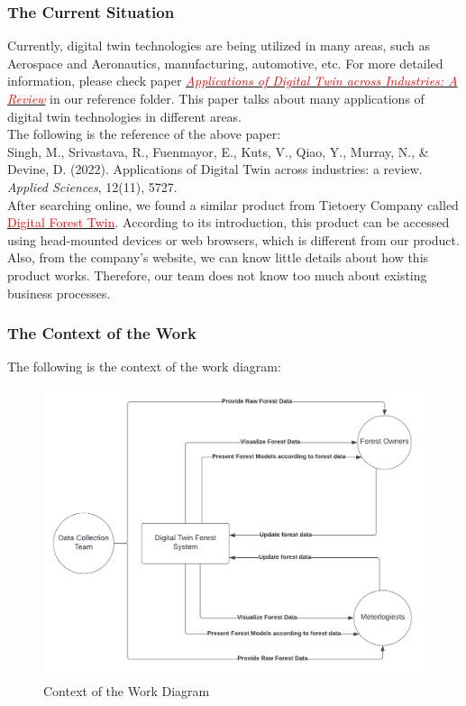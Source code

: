 \documentclass{article}
\begin{document}
\subsubsection{The Current Situation}
Currently, digital twin technologies are being utilized in many
areas, such as Aerospace and Aeronautics, manufacturing, automotive, etc. For more 
detailed information, please check paper \href{https://github.com/wuj187/DigitalTwinCAS/blob/main/refs/DT_Applications.pdf}{\textcolor{red}{\textit{Applications of Digital Twin across 
Industries: A Review}}} in our reference folder. This paper talks about 
many applications of digital twin technologies in different areas.\\
The following is the reference of the above paper:\\
Singh, M., Srivastava, R., Fuenmayor, E., Kuts, V., Qiao, Y., Murray, N., 
\& Devine, D. (2022). Applications of Digital Twin across industries: a 
review. \textit{Applied Sciences}, 12(11), 5727.\\

\noindent
After searching online, we found a similar product from Tietoery
Company called \href{https://www.tietoevry.com/en/industries/forest-pulp-paper-and-fibre/forest-solutions/wood-and-fibre-ecosystem-and-integration/digital-forest-twin/}{\textcolor{red}{Digital Forest Twin}}.
According to its introduction, this product can 
be accessed using head-mounted devices or
web browsers, which is different from our product. Also, 
from the company's website, we can know little details about how
 this product works. Therefore, our team does not know too much
 about existing business processes.

 \newpage
 
\subsubsection{The Context of the Work}
The following is the context of the work diagram:
\begin{figure}[H]
\begin{center}
\includegraphics[scale=0.7]{SRS_Pictures/Context_Use.png}
\end{center}
\caption{Context of the Work Diagram}
\end{figure}
\end{document}
